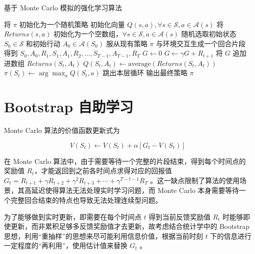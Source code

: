 \begin{algorithm}[H]
    \caption{基于 Monte Carlo 模拟的强化学习算法}
    \begin{algorithmic}[1] %
        \State 将 $\pi$ 初始化为一个随机策略
        \State 初始化向量 $Q(s,a), \forall s\in \mathcal S,a\in \mathcal{A}(s)$
        \State 将 $Returns(s,a)$ 初始化为一个空数组，$\forall s\in\mathcal S,a\in\mathcal{A}(s)$
        \Loop
        \State 随机选取初始状态 $S_0\in\mathcal S$ 和初始行动 $A_0\in\mathcal{A}(S_0)$
        \State 服从现有策略 $\pi$ 与环境交互生成一个回合片段
        \State 得到 $S_{0}, A_{0}, R_{1}, S_{1}, A_{1}, R_{2}, \ldots, S_{T-1}, A_{T-1}, R_{T}$
        \State $G\leftarrow 0$
        \State $G \leftarrow \gamma G+R_{t+1}$
        \State 将 $G$ 追加进数组 $Returns(S_t,A_t)$
        \State $Q(S_t,A_t)\leftarrow \mathrm{average}(Returns(S_t,A_t))$
        \State $\pi(S_t)\leftarrow \arg\max_aQ(S_t,a)$
        \State 跳出本层循环
        \EndIf
        \EndFor
        \EndLoop
        \State
        \State 输出最终策略 $\pi$
    \end{algorithmic}
\end{algorithm}

\section{Bootstrap 自助学习}

Monte Carlo 算法的价值函数更新式为

\begin{equation}\label{eq:mcupdate}
    V(S_t)\leftarrow V(S_t)+\alpha\left[G_t-V(S_t)\right]
\end{equation}

在 Monte Carlo 算法中，由于需要等待一个完整的片段结束，得到每个时间点的奖励值 $R_t$，才能返回到之前各时间点求得对应的回报值 $G_t = R_{t+1}+\gamma R_{t+2}+\gamma^2 R_{t+3}+\cdots+\gamma^{T-t-1} R_T$ 。这一缺点限制了算法的使用场景，其高延迟使得算法无法处理实时学习问题，而 Monte Carlo 本身需要等待一个完整回合结束的特点也导致无法处理连续型问题。

为了能够做到实时更新，即需要在每个时间点 $t$ 得到当前反馈奖励值 $R_t$ 时能够即使更新，而非累积足够多反馈奖励值才去更新，故考虑结合统计学中的 Bootstrap 思想\cite{efron1994introduction}\cite{2014wzjstatistics}，利用“重抽样”的思想来尽可能利用信息价值，根据当前时刻 $t$ 下的信息进行一定程度的“再利用”，使用估计值来替换 $G_t$ 。

